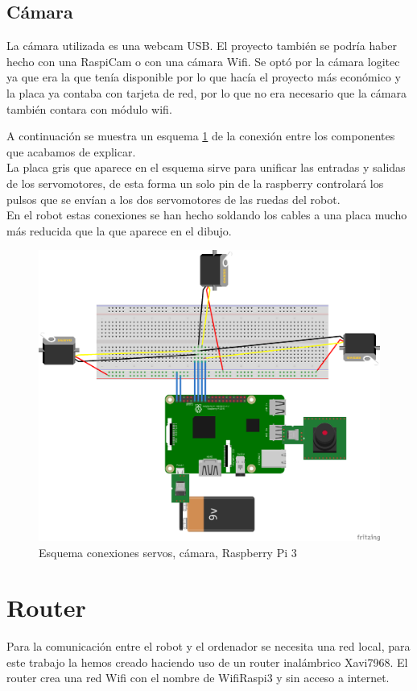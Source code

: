 \documentclass[twoside, 11pt]{epstfg}
\begin{document}
\subsection{Cámara}

La cámara utilizada es una webcam USB. El proyecto también se podría haber hecho con una RaspiCam o con una cámara Wifi. Se optó por la cámara logitec ya que era la que tenía disponible por lo que hacía el proyecto más económico y la placa ya contaba con tarjeta de red, por lo que no era necesario que la cámara también contara con módulo wifi.

A continuación se muestra un esquema \ref{Figura conexiones robot} de la conexión entre los componentes que acabamos de explicar.\\
La placa gris que aparece en el esquema sirve para unificar las entradas y salidas de los servomotores, de esta forma un solo pin de la raspberry controlará los pulsos que se envían a los dos servomotores de las ruedas del robot.\\
En el robot estas conexiones se han hecho soldando los cables a una placa mucho más reducida que la que aparece en el dibujo.


\begin{figure}[H]
	\centerline{
		\mbox{\includegraphics[width=.95\textwidth]{images/EsquemaServos.png}}
	}
	\caption{Esquema conexiones servos, cámara, Raspberry Pi 3}
	\label{Figura conexiones robot}
\end{figure}


\section{Router}
Para la comunicación entre el robot y el ordenador se necesita una red local,  para este trabajo la hemos creado haciendo uso de un router inalámbrico Xavi7968.
El router crea una red Wifi con el nombre de WifiRaspi3 y sin acceso a internet.
\end{document}
